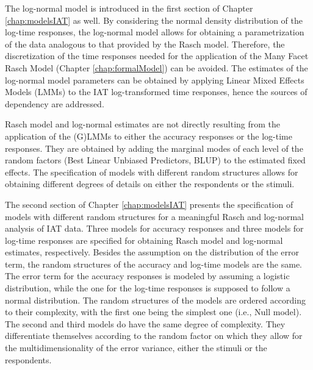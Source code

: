 \documentclass[12pt]{book}
\begin{document}
The log-normal model is introduced in the first section of Chapter \ref{chap:modelsIAT} as well. By considering the normal density distribution of the log-time responses, the log-normal model allows for obtaining a parametrization of the data analogous to that provided by the Rasch model. 
Therefore, the discretization of the time responses needed for the application of the Many Facet Rasch Model (Chapter \ref{chap:formalModel}) can be avoided. 
The estimates of the log-normal model parameters can be obtained by applying Linear Mixed Effects Models (LMMs) to the IAT log-transformed time responses, hence the sources of dependency are addressed.


Rasch model and log-normal estimates are not directly resulting from the application of the (G)LMMs to either the accuracy responses or the log-time responses. 
They are obtained by adding the marginal modes of each level of the random factors (Best Linear Unbiased Predictors, BLUP) to the estimated fixed effects. The specification of  models with different random structures allows for obtaining different degrees of details on either the respondents or the stimuli.

The second section of Chapter \ref{chap:modelsIAT} presents the specification of models with different random structures for a meaningful Rasch and log-normal analysis of IAT data. 
Three models for accuracy responses and three models for log-time responses are specified for obtaining Rasch model and log-normal estimates, respectively. 
Besides the assumption on the distribution of the error term, the random structures of the accuracy and log-time models are the same. The error term for the accuracy responses is modeled by assuming a logistic distribution, while the one for the log-time responses is supposed to follow a normal distribution. 
The random structures of the models are ordered according to their complexity, with the first one being the simplest one (i.e., Null model). 
The second and third models do have the same degree of complexity. They differentiate themselves according to the random factor on which they allow for the multidimensionality of the error variance, either the stimuli or the respondents. 
\end{document}
